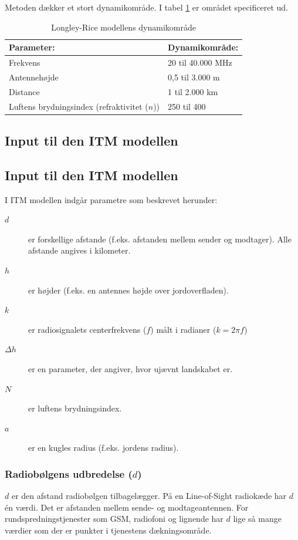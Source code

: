 Metoden dækker et stort dynamikområde. I tabel \ref{tab:lr-range} er området specificeret ud.

\begin{table}[h]
 \centering
 \begin{tabular}{ll}
   Parameter:                                   & Dynamikområde:\\
   \hline
   Frekvens                                     & 20 til 40.000 MHz\\
   Antennehøjde                                 & 0,5 til 3.000 m \\
   Distance                                     & 1 til 2.000 km \\
   Luftens brydningsindex (refraktivitet ($n$)) & 250 til 400 \\
 \end{tabular}
 \caption{Longley-Rice modellens dynamikområde}
 \label{tab:lr-range}
\end{table}
\FloatBarrier

\subsection{Input til den ITM modellen}



   
\subsection{Input til den ITM modellen}
I ITM modellen indgår parametre som beskrevet herunder:
\begin{description}
 \item [$d$] er forskellige afstande (f.eks. afstanden mellem sender og modtager). Alle afstande angives i kilometer.
 \item [$h$] er højder (f.eks. en antennes højde over jordoverfladen). 
 \item [$k$] er radiosignalets centerfrekvens ($f$) målt i radianer ($k = 2 \pi f$)
 \item [$\Delta h$] er en parameter, der angiver, hvor ujævnt landskabet er.
 \item [$N$] er luftens brydningsindex.
 \item [$a$] er en kugles radius (f.eks. jordens radius).
\end{description}

\subsubsection{Radiobølgens udbredelse ($d$)}
$d$ er den afstand radiobølgen tilbagelægger. På en Line-of-Sight radiokæde har $d$ én værdi. Det er afstanden mellem sende- og modtageantennen. For rundspredningstjenester som GSM, radiofoni og lignende har $d$ lige så mange værdier som der er punkter i tjenestens dækningsområde.   

